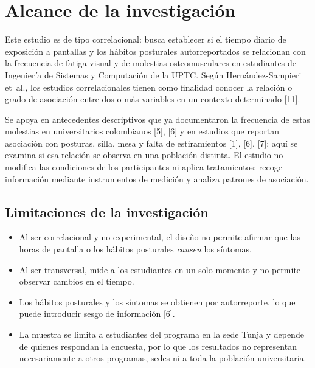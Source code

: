 
\section{Alcance de la investigación}

Este estudio es de tipo correlacional: busca establecer si el tiempo diario de
exposición a pantallas y los hábitos posturales autorreportados se relacionan con la
frecuencia de fatiga visual y de molestias osteomusculares en estudiantes de Ingeniería
de Sistemas y Computación de la UPTC. Según Hernández-Sampieri et~al., los estudios
correlacionales tienen como finalidad conocer la relación o grado de asociación entre
dos o más variables en un contexto determinado [11].

Se apoya en antecedentes descriptivos que ya documentaron la frecuencia de estas
molestias en universitarios colombianos [5], [6] y en estudios que reportan asociación
con posturas, silla, mesa y falta de estiramientos [1], [6], [7]; aquí se examina si esa
relación se observa en una población distinta. El estudio no modifica las condiciones de
los participantes ni aplica tratamientos: recoge información mediante instrumentos de
medición y analiza patrones de asociación.

\subsection*{Limitaciones de la investigación}

\begin{itemize}[leftmargin=1.5em,itemsep=0.3em]
  \item Al ser correlacional y no experimental, el diseño no permite afirmar que las
  horas de pantalla o los hábitos posturales \emph{causen} los síntomas.
  \item Al ser transversal, mide a los estudiantes en un solo momento y no permite
  observar cambios en el tiempo.
  \item Los hábitos posturales y los síntomas se obtienen por autorreporte, lo que puede
  introducir sesgo de información [6].
  \item La muestra se limita a estudiantes del programa en la sede Tunja y depende de
  quienes respondan la encuesta, por lo que los resultados no representan
  necesariamente a otros programas, sedes ni a toda la población universitaria.
\end{itemize}
